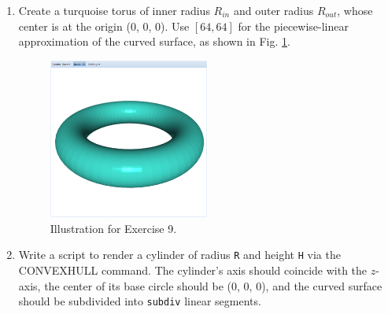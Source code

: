 \documentclass{article}
\begin{document}
\begin{enumerate}
\item Create a turquoise torus of inner radius $R_{in}$ and outer radius $R_{out}$, whose center 
is at the origin (0, 0, 0). Use $[64, 64]$ for the piecewise-linear approximation 
of the curved surface, as shown in Fig. \ref{fig:a9}.


\begin{figure}[!ht]
\begin{center}
\includegraphics[width=0.5\textwidth]{img/a9-turquoise-torus.png}
\end{center}
\vspace{-2mm}
\caption{Illustration for Exercise 9.}
\label{fig:a9}
\end{figure}

\item Write a script to render a cylinder of radius {\tt R} and height {\tt H}
      via the CONVEXHULL command. The cylinder's axis should coincide with the 
      $z$-axis, the center of its base circle should be (0, 0, 0), and the 
      curved surface should be subdivided into {\tt subdiv} linear segments.

\end{enumerate}
\newpage
\end{document}
